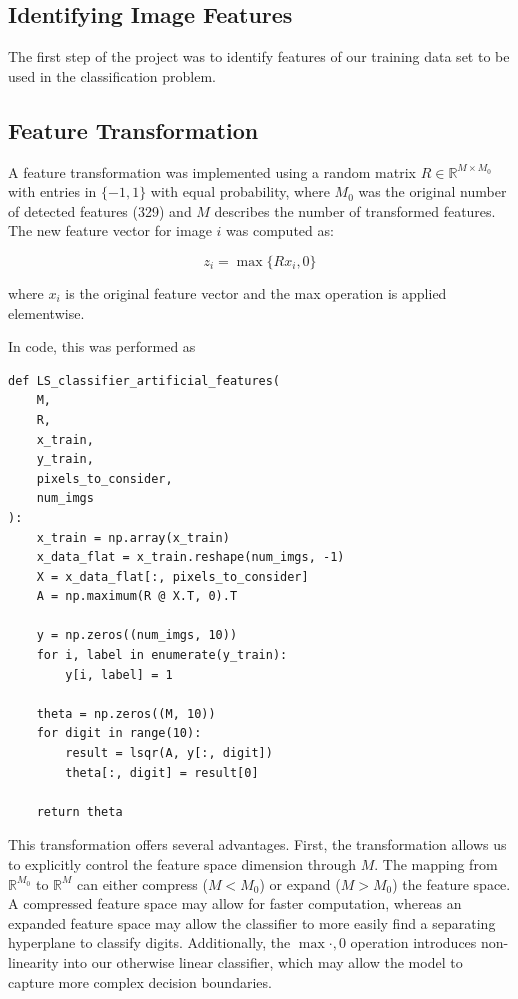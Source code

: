 \documentclass[conference]{IEEEtran}
\begin{document}
\subsection{Identifying Image Features}
The first step of the project was to identify features of our training data set to be used in the classification problem. 

\subsection{Feature Transformation}
A feature transformation was implemented using a random matrix $R \in \mathbb{R}^{M \times M_0}$ with entries in $\{-1,1\}$ with equal probability, where $M_0$ was the original number of detected features (329) and $M$ describes the number of transformed features. The new feature vector for image $i$ was computed as:

$$z_i = \max\{Rx_i, 0\}$$

where $x_i$ is the original feature vector and the max operation is applied elementwise.

In code, this was performed as
\begin{verbatim}
def LS_classifier_artificial_features(
    M,
    R,
    x_train,
    y_train,
    pixels_to_consider,
    num_imgs
):
    x_train = np.array(x_train)
    x_data_flat = x_train.reshape(num_imgs, -1)
    X = x_data_flat[:, pixels_to_consider]
    A = np.maximum(R @ X.T, 0).T

    y = np.zeros((num_imgs, 10))
    for i, label in enumerate(y_train):
        y[i, label] = 1
    
    theta = np.zeros((M, 10))
    for digit in range(10):
        result = lsqr(A, y[:, digit])
        theta[:, digit] = result[0]

    return theta

\end{verbatim}

This transformation offers several advantages. First, the transformation allows us to explicitly control the feature space dimension through $M$. The mapping from $\mathbb{R}^{M_0}$ to $\mathbb{R}^M$ can either compress ($M < M_0$) or expand ($M > M_0$) the feature space. A compressed feature space may allow for faster computation, whereas an expanded feature space may allow the classifier to more easily find a separating hyperplane to classify digits. Additionally, the $\max{\cdot,0}$ operation introduces non-linearity into our otherwise linear classifier, which may allow the model to capture more complex decision boundaries.
\end{document}
